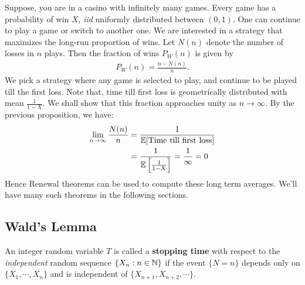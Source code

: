 \documentclass[a4paper,10pt, english]{article}
\begin{document}
\begin{shaded*}
Suppose, you are in a casino with infinitely many games. 
Every game has a probability of win $X$, \textit{iid} uniformly distributed between $(0,1)$. 
One can continue to play a game or switch to another one. We are interested in a strategy that maximizes the long-run proportion of wins.
Let $N(n)$ denote the number of losses in $n$ plays. 
Then the fraction of wins $P_W(n)$ is given by 
\begin{align*}
P_W(n) = \frac{n-N(n)}{n}.
\end{align*}
We pick a strategy where any game is selected to play, and continue to be played till the first loss. Note that, time till first loss is geometrically distributed with mean $\frac{1}{1-X}$. We shall show that this fraction approaches unity as $n \to \infty$. By the previous proposition, we have:
\begin{align*}
\lim_{n \to \infty} \frac{N(n)}{n} &= \frac{1}{\mathbb{E}[\mbox{Time till first loss}]} \\
&= \frac{1}{\mathbb{E}\left[\frac{1}{1-X}\right]} = \frac{1}{\infty} = 0
\end{align*}
Hence Renewal theorems can be used to compute these long term averages. We'll have many such theorems in the following sections.
\end{shaded*}

\subsection{Wald's Lemma}
An integer random variable $T$ is called a \textbf{stopping time} with respect to the \textit{independent} random sequence $\{X_n: n \in \mathbb{N}\}$ if the event $\{N=n\}$ depends only on $\{X_1,\cdots,X_n\}$ and is independent of $\{X_{n+1}, X_{n+2},\cdots\}$. 
\end{document}
